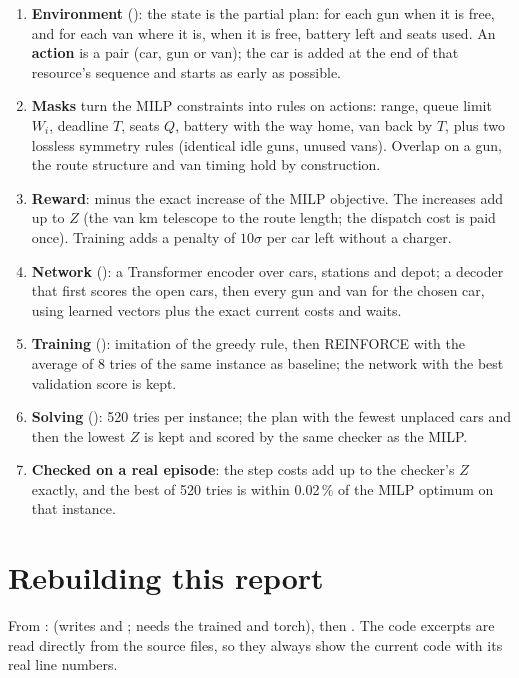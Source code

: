\begin{enumerate}
  \item \textbf{Environment} (): the state is the partial plan: for each gun when it is free, and for each van where it is, when it is free, battery left and seats used. An \textbf{action} is a pair (car, gun or van); the car is added at the end of that resource's sequence and starts as early as possible.
  \item \textbf{Masks} turn the MILP constraints into rules on actions: range, queue limit $W_i$, deadline $T$, seats $Q$, battery with the way home, van back by $T$, plus two lossless symmetry rules (identical idle guns, unused vans). Overlap on a gun, the route structure and van timing hold by construction.
  \item \textbf{Reward}: minus the exact increase of the MILP objective. The increases add up to $Z$ (the van km telescope to the route length; the dispatch cost is paid once). Training adds a penalty of $10\sigma$ per car left without a charger.
  \item \textbf{Network} (): a Transformer encoder over cars, stations and depot; a decoder that first scores the open cars, then every gun and van for the chosen car, using learned vectors plus the exact current costs and waits.
  \item \textbf{Training} (): imitation of the greedy rule, then REINFORCE with the average of 8 tries of the same instance as baseline; the network with the best validation score is kept.
  \item \textbf{Solving} (): 520 tries per instance; the plan with the fewest unplaced cars and then the lowest $Z$ is kept and scored by the same checker as the MILP.
  \item \textbf{Checked on a real episode}: the step costs add up to the checker's $Z$ exactly, and the best of 520 tries is within 0.02\,\% of the MILP optimum on that instance.
\end{enumerate}

\section*{Rebuilding this report}
From :  (writes  and ; needs the trained  and torch), then . The code excerpts are read directly from the source files, so they always show the current code with its real line numbers.
